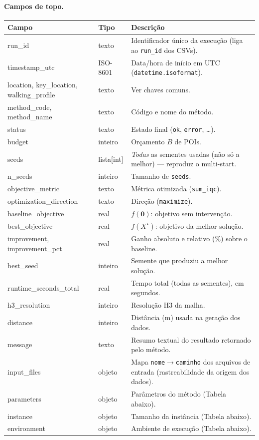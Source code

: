 \documentclass[11pt,a4paper]{article}
\begin{document}
\paragraph{Campos de topo.}
\begin{center}\small
\begin{tabular}{@{}>{\ttfamily}l l p{7.8cm}@{}}
\toprule
\normalfont Campo & \normalfont Tipo & \normalfont Descrição \\
\midrule
run\_id        & texto    & Identificador único da execução (liga ao \texttt{run\_id} dos CSVs). \\
timestamp\_utc & ISO-8601 & Data/hora de início em UTC (\texttt{datetime.isoformat}). \\
location, key\_location, walking\_profile & texto & Ver chaves comuns. \\
method\_code, method\_name & texto & Código e nome do método. \\
status         & texto    & Estado final (\texttt{ok}, \texttt{error}, \dots). \\
budget         & inteiro  & Orçamento $B$ de POIs. \\
seeds          & lista[int] & \emph{Todas} as sementes usadas (não só a melhor) --- reproduz o multi-start. \\
n\_seeds       & inteiro  & Tamanho de \texttt{seeds}. \\
objective\_metric & texto & Métrica otimizada (\texttt{sum\_iqc}). \\
optimization\_direction & texto & Direção (\texttt{maximize}). \\
baseline\_objective & real & $f(\mathbf 0)$: objetivo sem intervenção. \\
best\_objective & real    & $f(X^\star)$: objetivo da melhor solução. \\
improvement, improvement\_pct & real & Ganho absoluto e relativo (\%) sobre o baseline. \\
best\_seed     & inteiro  & Semente que produziu a melhor solução. \\
runtime\_seconds\_total & real & Tempo total (todas as sementes), em segundos. \\
h3\_resolution & inteiro  & Resolução H3 da malha. \\
distance       & inteiro  & Distância (m) usada na geração dos dados. \\
message        & texto    & Resumo textual do resultado retornado pelo método. \\
input\_files   & objeto   & Mapa \texttt{nome}$\to$\texttt{caminho} dos arquivos de entrada (rastreabilidade da origem dos dados). \\
parameters     & objeto   & Parâmetros do método (Tabela abaixo). \\
instance       & objeto   & Tamanho da instância (Tabela abaixo). \\
environment    & objeto   & Ambiente de execução (Tabela abaixo). \\
\bottomrule
\end{tabular}
\end{center}
\end{document}
